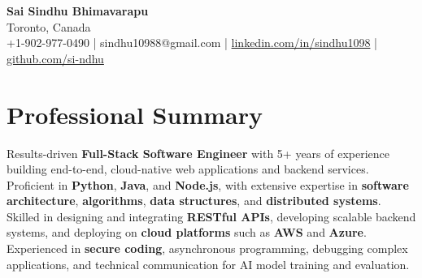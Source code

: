 \documentclass[letterpaper,11pt]{article}
\begin{document}
\begin{center}
  {\Large \textbf{Sai Sindhu Bhimavarapu}} \\
  Toronto, Canada \\
  +1-902-977-0490 \enspace | \enspace sindhu10988@gmail.com \enspace | \enspace \href{https://www.linkedin.com/in/sindhu1098/}{linkedin.com/in/sindhu1098} \enspace | \enspace \href{https://github.com/si-ndhu}{github.com/si-ndhu}
\end{center}

\section{Professional Summary}
  \begin{itemize}[leftmargin=0.15in, label={}]
    \small{\item{
     Results-driven \textbf{Full-Stack Software Engineer} with 5+ years of experience building end-to-end, cloud-native web applications and backend services. Proficient in \textbf{Python}, \textbf{Java}, and \textbf{Node.js}, with extensive expertise in \textbf{software architecture}, \textbf{algorithms}, \textbf{data structures}, and \textbf{distributed systems}. Skilled in designing and integrating \textbf{RESTful APIs}, developing scalable backend systems, and deploying on \textbf{cloud platforms} such as \textbf{AWS} and \textbf{Azure}. Experienced in \textbf{secure coding}, asynchronous programming, debugging complex applications, and technical communication for AI model training and evaluation.
    }}
  \end{itemize}
\vspace{-16pt}

\end{document}
